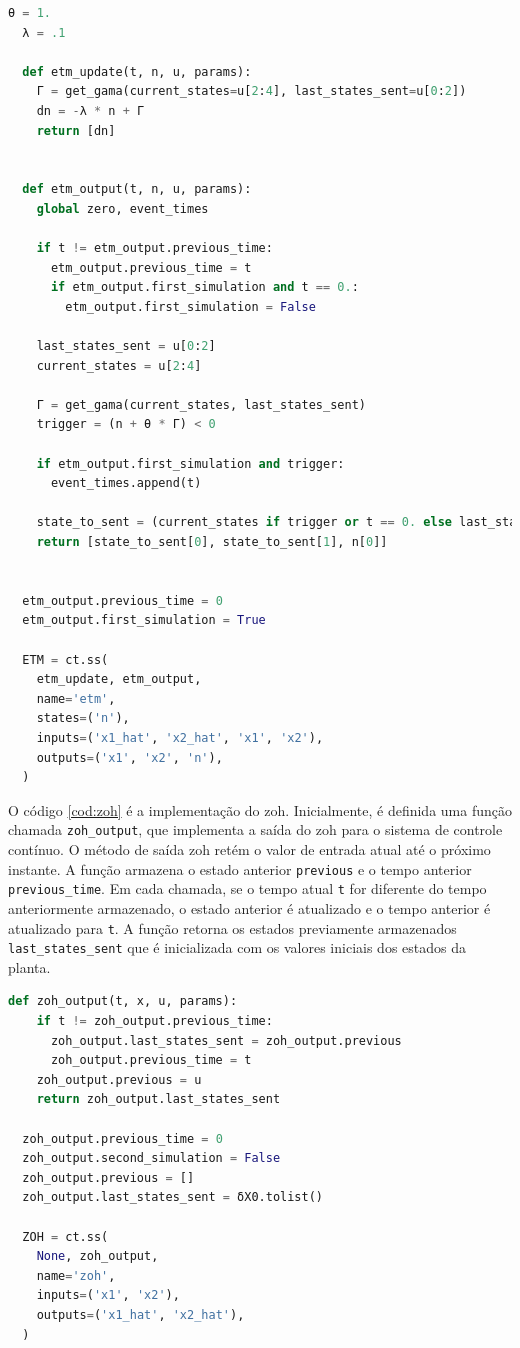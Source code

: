 \vspace{8pt}
\begin{lstlisting}[language=Python, caption={Implementação do \acrshort{etm} dinâmico.}, label=cod:dynamic_etm]
  θ = 1.
  λ = .1
  
  def etm_update(t, n, u, params):
    Γ = get_gama(current_states=u[2:4], last_states_sent=u[0:2])
    dn = -λ * n + Γ
    return [dn]


  def etm_output(t, n, u, params):
    global zero, event_times

    if t != etm_output.previous_time:
      etm_output.previous_time = t
      if etm_output.first_simulation and t == 0.:
        etm_output.first_simulation = False

    last_states_sent = u[0:2]
    current_states = u[2:4]

    Γ = get_gama(current_states, last_states_sent)
    trigger = (n + θ * Γ) < 0

    if etm_output.first_simulation and trigger:
      event_times.append(t)

    state_to_sent = (current_states if trigger or t == 0. else last_states_sent)
    return [state_to_sent[0], state_to_sent[1], n[0]]


  etm_output.previous_time = 0
  etm_output.first_simulation = True

  ETM = ct.ss(
    etm_update, etm_output,
    name='etm',
    states=('n'),
    inputs=('x1_hat', 'x2_hat', 'x1', 'x2'),
    outputs=('x1', 'x2', 'n'),
  )
  \end{lstlisting}

O código \ref{cod:zoh} é a implementação do \acrshort{zoh}. Inicialmente, é definida uma função chamada \texttt{zoh\_output}, que implementa a saída do \acrshort{zoh} para o sistema de controle contínuo. O método de saída \acrshort{zoh} retém o valor de entrada atual até o próximo instante. A função armazena o estado anterior \texttt{previous} e o tempo anterior \texttt{previous\_time}. Em cada chamada, se o tempo atual \texttt{t} for diferente do tempo anteriormente armazenado, o estado anterior é atualizado e o tempo anterior é atualizado para \texttt{t}. A função retorna os estados previamente armazenados \texttt{last\_states\_sent} que é inicializada com os valores iniciais dos estados da planta.

\vspace{8pt}
\begin{lstlisting}[language=Python, caption={Implementação do \acrshort{zoh}}, label=cod:zoh]
  def zoh_output(t, x, u, params):
    if t != zoh_output.previous_time:
      zoh_output.last_states_sent = zoh_output.previous
      zoh_output.previous_time = t
    zoh_output.previous = u
    return zoh_output.last_states_sent

  zoh_output.previous_time = 0
  zoh_output.second_simulation = False
  zoh_output.previous = []
  zoh_output.last_states_sent = δX0.tolist()

  ZOH = ct.ss(
    None, zoh_output,
    name='zoh',
    inputs=('x1', 'x2'),
    outputs=('x1_hat', 'x2_hat'),
  )
\end{lstlisting}

